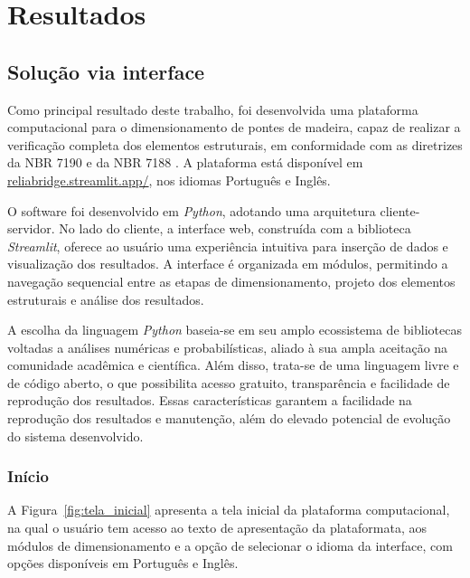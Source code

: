 \chapter{Resultados}

\section{Solução via interface}

Como principal resultado deste trabalho, foi desenvolvida uma plataforma computacional para o dimensionamento de pontes de madeira, capaz de realizar a verificação completa dos elementos estruturais, em conformidade com as diretrizes da NBR 7190 \parencite{NBR7190-1:2022} e da NBR 7188 \parencite{nbr7188}. A plataforma está disponível em \url{reliabridge.streamlit.app/}, nos idiomas Português e Inglês.

O software foi desenvolvido em \textit{Python}, adotando uma arquitetura cliente-servidor. No lado do cliente, a interface web, construída com a biblioteca \textit{Streamlit}, oferece ao usuário uma experiência intuitiva para inserção de dados e visualização dos resultados. A interface é organizada em módulos, permitindo a navegação sequencial entre as etapas de dimensionamento, projeto dos elementos estruturais e análise dos resultados.

A escolha da linguagem \textit{Python} baseia-se em seu amplo ecossistema de bibliotecas voltadas a análises numéricas e probabilísticas, aliado à sua ampla aceitação na comunidade acadêmica e científica. Além disso, trata-se de uma linguagem livre e de código aberto, o que possibilita acesso gratuito, transparência e facilidade de reprodução dos resultados. Essas características garantem a facilidade na reprodução dos resultados e manutenção, além do elevado potencial de evolução do sistema desenvolvido.

\subsection{Início}

A Figura~\ref{fig:tela_inicial} apresenta a tela inicial da plataforma computacional, 
na qual o usuário tem acesso ao texto de apresentação da plataformata, aos módulos de dimensionamento e a opção de selecionar o idioma da interface, com opções disponíveis em Português e Inglês.

